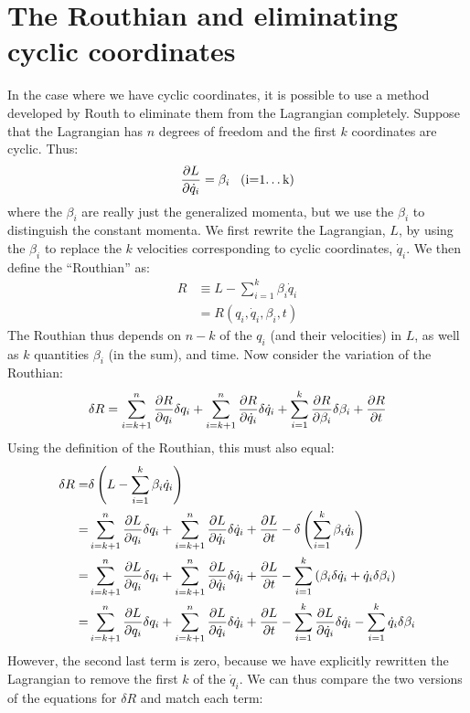 \section{The Routhian and eliminating cyclic coordinates}
In the case where we have cyclic coordinates, it is possible to use a method developed by Routh to eliminate them from the Lagrangian completely. Suppose that the Lagrangian has $n$ degrees of freedom and the first $k$ coordinates are cyclic. Thus:
\begin{align}
\frac{\partial L}{\partial \dot{q}_i}=\beta_i \;\;\;\text{(i=1\dots k)}
\label{eqn:lbeta}
\end{align} 
where the $\beta_i$ are really just the generalized momenta, but we use the $\beta_i$ to distinguish the constant momenta. We first rewrite the Lagrangian, $L$, by using the $\beta_i$ to replace the $k$ velocities corresponding to cyclic coordinates, $\dot{q}_i$. We then define the ``Routhian'' as:
\begin{align}
R&\equiv L-\sum_{i=1}^k\beta_i\dot{q}_i\nonumber\\
&=R(q_i,\dot{q}_i,\beta_i, t)
\end{align}
The Routhian thus depends on $n-k$ of the $q_i$ (and their velocities) in $L$, as well as $k$ quantities $\beta_i$ (in the sum), and time. Now consider the variation of the Routhian:
\begin{align}
\delta R=\sum_{i=k+1}^{n}\frac{\partial R}{\partial q_i}\delta q_i+\sum_{i=k+1}^{n}\frac{\partial R}{\partial \dot{q}_i}\delta \dot{q}_i+\sum_{i=1}^k\frac{\partial R}{\partial \beta_i}\delta \beta_i+\frac{\partial R}{\partial t}
\end{align}
Using the definition of the Routhian, this must also equal:
\begin{align}
\delta R=&\delta\left(L-\sum_{i=1}^k\beta_i\dot{q}_i \right)\nonumber\\
=&\sum_{i=k+1}^{n}\frac{\partial L}{\partial q_i}\delta q_i+\sum_{i=k+1}^{n}\frac{\partial L}{\partial \dot{q}_i}\delta \dot{q}_i+\frac{\partial L}{\partial t}-\delta\left(\sum_{i=1}^k\beta_i\dot{q}_i\right)\nonumber\\
=&\sum_{i=k+1}^{n}\frac{\partial L}{\partial q_i}\delta q_i+\sum_{i=k+1}^{n}\frac{\partial L}{\partial \dot{q}_i}\delta \dot{q}_i+\frac{\partial L}{\partial t}-\sum_{i=1}^k\left(\beta_i\delta\dot{q}_i+\dot{q}_i\delta\beta_i\right)\nonumber\\
=&\sum_{i=k+1}^{n}\frac{\partial L}{\partial q_i}\delta q_i+\sum_{i=k+1}^{n}\frac{\partial L}{\partial \dot{q}_i}\delta \dot{q}_i+\frac{\partial L}{\partial t}-\sum_{i=1}^k\frac{\partial L}{\partial \dot{q}_i}\delta\dot{q}_i-\sum_{i=1}^k\dot{q}_i\delta\beta_i
\end{align}
However, the second last term is zero, because we have explicitly rewritten the Lagrangian to remove the first $k$ of the $\dot{q}_i$. We can thus compare the two versions of the equations for $\delta R$ and match each term:

